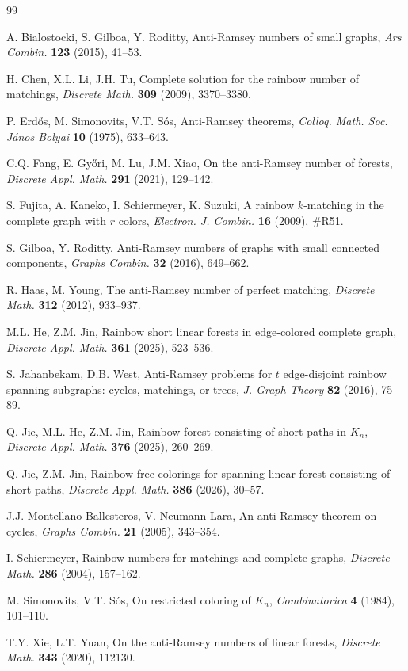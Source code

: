 \documentclass[12pt]{article}
\begin{document}
\begin{thebibliography}{99}
	
	 A. Bialostocki, S. Gilboa, Y. Roditty, Anti-Ramsey numbers of small graphs, \emph{Ars Combin.} \textbf{123} (2015), 41–53.
	
	 H. Chen, X.L. Li, J.H. Tu, Complete solution for the rainbow number of matchings, \emph{Discrete Math.} \textbf{309} (2009), 3370–3380.
	
	 P. Erdős, M. Simonovits, V.T. Sós, Anti-Ramsey theorems, \emph{Colloq. Math. Soc. János Bolyai} \textbf{10} (1975), 633–643.
	
	 C.Q. Fang, E. Győri, M. Lu, J.M. Xiao, On the anti-Ramsey number of forests, \emph{Discrete Appl. Math.} \textbf{291} (2021), 129–142.
	
	 S. Fujita, A. Kaneko, I. Schiermeyer, K. Suzuki, A rainbow $k$-matching in the complete graph with $r$ colors, \emph{Electron. J. Combin.} \textbf{16} (2009), \#R51.
	
	 S. Gilboa, Y. Roditty, Anti-Ramsey numbers of graphs with small connected components, \emph{Graphs Combin.} \textbf{32} (2016), 649–662.
	
	 R. Haas, M. Young, The anti-Ramsey number of perfect matching, \emph{Discrete Math.} \textbf{312} (2012), 933–937.
	
	 M.L. He, Z.M. Jin, Rainbow short linear forests in edge-colored complete graph, \emph{Discrete Appl. Math.} \textbf{361} (2025), 523–536.
	
	 S. Jahanbekam, D.B. West, Anti-Ramsey problems for $t$ edge-disjoint rainbow spanning subgraphs: cycles, matchings, or trees, \emph{J. Graph Theory} \textbf{82} (2016), 75–89.
	
	 Q. Jie, M.L. He, Z.M. Jin, Rainbow forest consisting of short paths in $K_n$, \emph{Discrete Appl. Math.} \textbf{376} (2025), 260–269.
	
	 Q. Jie, Z.M. Jin, Rainbow‑free colorings for spanning linear forest consisting of short paths, \emph{Discrete Appl. Math.} \textbf{386} (2026), 30–57.
	
	 J.J. Montellano-Ballesteros, V. Neumann-Lara, An anti-Ramsey theorem on cycles, \emph{Graphs Combin.} \textbf{21} (2005), 343–354.
	
	 I. Schiermeyer, Rainbow numbers for matchings and complete graphs, \emph{Discrete Math.} \textbf{286} (2004), 157–162.
	
	 M. Simonovits, V.T. Sós, On restricted coloring of $K_n$, \emph{Combinatorica} \textbf{4} (1984), 101–110.
	
	 T.Y. Xie, L.T. Yuan, On the anti-Ramsey numbers of linear forests, \emph{Discrete Math.} \textbf{343} (2020), 112130.
	
\end{thebibliography}
\end{document}
